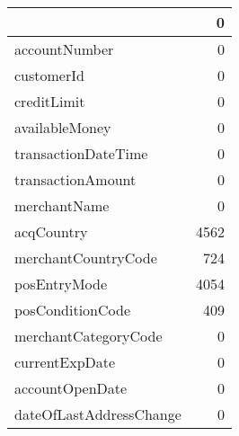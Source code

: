 \begin{tabu}{lr}
\toprule
 & 0 \\
\midrule
accountNumber & 0 \\
customerId & 0 \\
creditLimit & 0 \\
availableMoney & 0 \\
transactionDateTime & 0 \\
transactionAmount & 0 \\
merchantName & 0 \\
acqCountry & 4562 \\
merchantCountryCode & 724 \\
posEntryMode & 4054 \\
posConditionCode & 409 \\
merchantCategoryCode & 0 \\
currentExpDate & 0 \\
accountOpenDate & 0 \\
dateOfLastAddressChange & 0 \\
\bottomrule
\end{tabu}